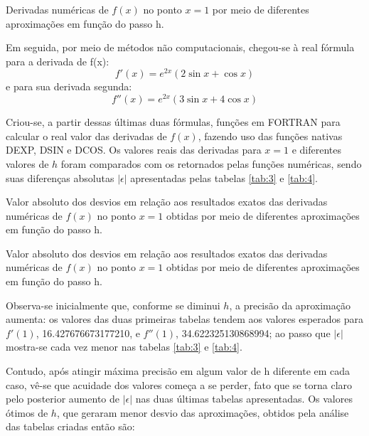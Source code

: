 \documentclass{article}
\begin{document}
\begin{table}[h]
  \centering
  
  \caption{Derivadas numéricas de $f (x)$ no ponto $x = 1$ por meio de diferentes aproximações em função do passo h.}
  \label{tab:2}
\end{table}

Em seguida, por meio de métodos não computacionais, chegou-se à real fórmula para a derivada de f(x):
\[f'(x)=e^{2x}(2\sin{x}+\cos{x})\]
e para sua derivada segunda:
\[f''(x)=e^{2x}(3\sin{x}+4\cos{x})\]

Criou-se, a partir dessas últimas duas fórmulas, funções em FORTRAN para calcular o real valor das derivadas de $f(x)$, fazendo uso das funções nativas DEXP, DSIN e DCOS. Os valores reais das derivadas para $x=1$ e diferentes valores de $h$ foram comparados com os retornados pelas funções numéricas, sendo suas diferenças absolutas $|\epsilon|$ apresentadas pelas tabelas \ref{tab:3} e \ref{tab:4}.


\begin{table}[h]
  \centering
  
  \caption{Valor absoluto dos desvios em relação aos resultados exatos das derivadas numéricas de $f (x)$ no ponto $x = 1$ obtidas por meio de diferentes aproximações em função do passo h.}
  \label{tab:3}
\end{table}

\begin{table}[h]
  \centering
  
  \caption{Valor absoluto dos desvios em relação aos resultados exatos das derivadas numéricas de $f(x)$ no ponto $x = 1$ obtidas por meio de diferentes aproximações em função do passo h.}
  \label{tab:4}
\end{table}

Observa-se inicialmente que, conforme se diminui $h$, a precisão da aproximação aumenta: os valores das duas primeiras tabelas tendem aos valores esperados para $f'(1)$, 16.427676673177210, e $f''(1)$, 34.622325130868994; ao passo que $|\epsilon|$ mostra-se cada vez menor nas tabelas \ref{tab:3} e \ref{tab:4}.\par
Contudo, após atingir máxima precisão em algum valor de h diferente em cada caso, vê-se que acuidade dos valores começa a se perder, fato que se torna claro pelo posterior aumento de  $|\epsilon|$ nas duas últimas tabelas apresentadas. %
Os valores ótimos de $h$, que geraram menor desvio das aproximações, obtidos pela análise das tabelas criadas então são:
\end{document}
